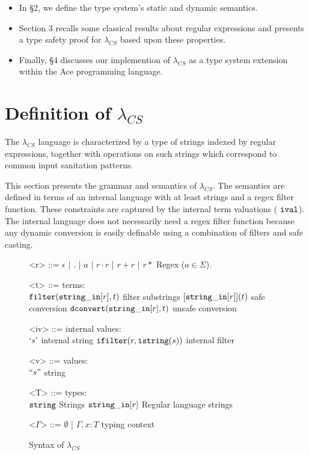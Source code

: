 \documentclass[10pt,preprint]{sigplanconf}
\theoremstyle{definition}
\newcommand{\strin}{{\tt string\_in}}
\newcommand{\str}{ {\tt string} }
\newcommand{\istr}{ {\tt istring} }
\newcommand{\dconvert}[2]{ {\tt dconvert}(#1,#2) }
\newcommand{\filter}[2]{ {\tt filter}(#1,#2) }
\newcommand{\ival}{ \ {\tt ival} }
\newcommand{\istrf}[1]{`#1\textrm'} %
\newcommand{\strf}[1]{``#1"}
\newcommand{\lcs}{\lambda_{CS}}
\begin{document}
\begin{itemize}
  \item In \S 2, we define the type system's static and dynamic semantics.
  \item Section 3 recalls some classical results about regular expressions and presents a type safety proof for $\lcs$ based upon these properties.
  \item Finally, \S 4 discusses our implemention of $\lcs$ as a type system extension  within the Ace programming language.
\end{itemize}

\section{Definition of $\lcs$}

The $\lcs$ language is characterized by a type of strings indexed by regular
expressions, together with operations on such strings which correspond to common
input sanitation patterns.

This section presents the grammar and semantics of $\lcs$.
The semantics are defined in terms of an internal language with at least strings and a regex filter function.
These constraints are captured by the internal term valuations ($\ival$).
The internal language does not necessarily need a regex filter function because
any dynamic conversion is easily definable using a combination of filters and safe
casting.

%
%
\begin{figure}
\begin{grammar}
<r> ::= $\epsilon$ | $.$ | $a$ | $r \cdot r$ | $r + r$ | $r*$ \hfill Regex ($a \in \Sigma$).

<t> ::= 			\hfill terms: 					\\
$\filter{\strin[r]}{t}$ 		\hfill filter substrings			\alt
$[\strin[r]](t)$ \hfill safe conversion \alt
$\dconvert{\strin[r]}{t}$ \hfill unsafe conversion

<iv> ::= 			\hfill internal values:					\\
$\istrf{s}$				\hfill internal string \alt
${\tt ifilter}(r, \istr(s))$ \hfill internal filter

<v> ::= \hfill values: \\
$\strf{s}$ \hfill string

<T> ::=				\hfill	types:					\\
$\str$  \hfill Strings \alt
$\strin[r]$				\hfill Regular language strings		

<$\Gamma$> ::=	$\emptyset$	 | $\Gamma,x:T$ \hfill typing context
\end{grammar}
\caption{Syntax of $\lcs$}
\label{fig:lcsSyntax}
\end{figure}
\end{document}
